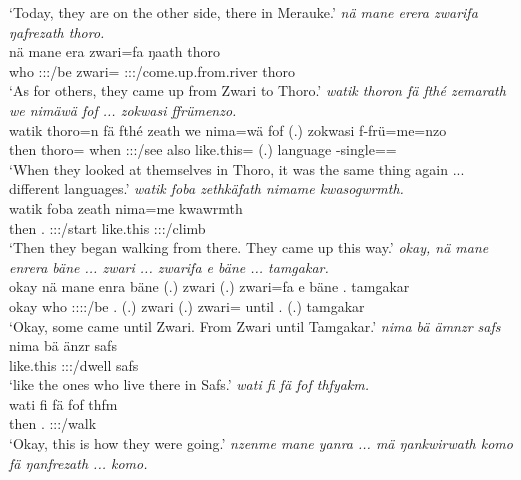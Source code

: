 \begin{exe}
	\trans `Today, they are on the other side, there in Merauke.'
	\emph{nä mane erera zwarifa ŋafrezath thoro.}\\
	\gll nä mane era zwari=fa ŋaath thoro\\ 
	{\Indf} who \Stpl:\Sbj:\Pst:\Ipfv/be zwari={\Abl} \Stpl:\Sbj:\Pst:\Ipfv/come.up.from.river thoro\\
	\trans `As for others, they came up from Zwari to Thoro.'
	\emph{watik thoron fä fthé zemarath we nimäwä fof ... zokwasi ffrümenzo.}\\
	\gll watik thoro=n fä fthé zeath we nima=wä fof (.) zokwasi f-frü=me=nzo\\ 
	then thoro={\Loc} {\Dist} when \Stpl:\Sbj:\Pst:\Ipfv/see also like.this={\Emph} {\Emph} (.) language \Redup-single=\Ins=\Only\\
	\trans `When they looked at themselves in Thoro, it was the same thing again ... different languages.'
	\emph{watik foba zethkäfath nimame kwasogwrmth.}\\
	\gll watik foba zeath nima=me kwawrmth\\ 
	then \Dist.{\Abl} \Stpl:\Sbj:\Pst:\Ipfv/start like.this \Stpl:\Sbj:\Pst:\Dur/climb\\
	\trans `Then they began walking from there. They came up this way.'
	\emph{okay, nä mane enrera bäne ... zwari ... zwarifa e bäne ... tamgakar.}\\
	\gll okay nä mane enra bäne (.) zwari (.) zwari=fa e bäne . tamgakar\\ 
	okay {\Indf} who \Stpl:\Sbj:\Pst:\Ipfv:\Venit/be \Recog.{\Abs} (.) zwari (.) zwari={\Abl} until \Recog.{\Abs} (.) tamgakar\\
	\trans `Okay, some came until Zwari. From Zwari until Tamgakar.'
	\emph{nima bä ämnzr safs}\\
	\gll nima bä änzr safs\\ 
	like.this \Med{} \Stpl:\Sbj:\Nonpast:\Ipfv/dwell safs\\
	\trans `like the ones who live there in Safs.'
	\emph{wati fi fä fof thfyakm.}\\
	\gll wati fi fä fof thfm\\ 
	then \Third.{\Abs} {\Dist} {\Emph} \Stpl:\Sbj:\Pst:\Dur/walk\\
	\trans `Okay, this is how they were going.'
	\emph{nzenme mane yanra ... mä ŋankwirwath komo fä ŋanfrezath ... komo.}\\

\end{exe}
